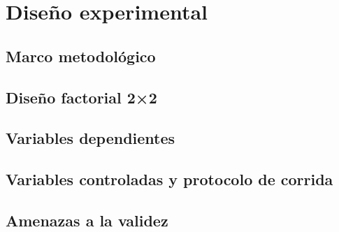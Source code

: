 \chapter{Diseño experimental}\label{cap:diseno-experimental}


\section{Marco metodológico}

\section{Diseño factorial 2×2}

\section{Variables dependientes}

\section{Variables controladas y protocolo de corrida}

\section{Amenazas a la validez}
